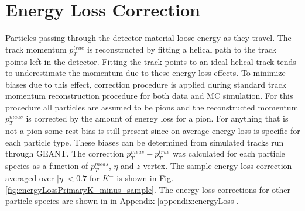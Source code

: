 

\chapter{Energy Loss Correction}\label{chap:energyLossCorrection}
Particles passing through the detector material loose energy as they travel. The track momentum $p_T^{true}$ is reconstructed by fitting a helical path to the track points left in the detector. Fitting the track points to an ideal
helical track tends to underestimate the momentum due to these energy loss effects. To minimize biases due to this effect, correction procedure is applied 
during standard track momentum reconstruction procedure for both data and MC simulation. For this procedure all particles are assumed to be pions and the reconstructed momentum $p_T^{meas}$ is corrected by the amount of energy loss for a pion.  For anything that is not a pion some rest bias  is still present since on average energy loss is specific for each particle type. These biases  can be determined from simulated tracks run through GEANT.
The correction $p_T^{meas}-p_T^{true}$ was calculated for each particle species as a function of $p_T^{meas}$, $\eta$ and $z$-vertex. The sample energy loss correction averaged over $|\eta|<0.7$ for $K^-$ is shown in Fig. \ref{fig:energyLossPrimaryK_minus_sample}. 
\noindent The energy loss corrections for other particle species are shown in  in Appendix \ref{appendix:energyLoss}.\newline



